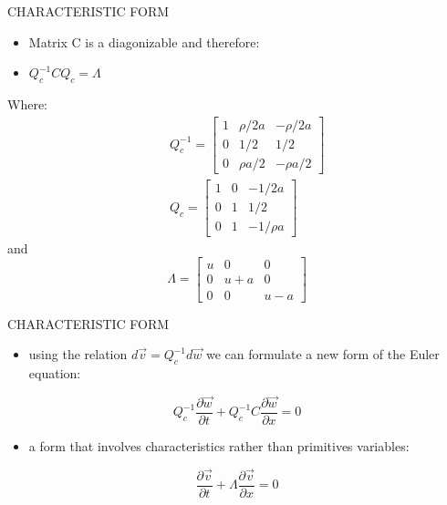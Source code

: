 \documentclass{beamer}
\begin{document}
\begin{frame}{CHARACTERISTIC FORM}
  \begin{itemize}
   \item Matrix C is a diagonizable and therefore:
   \item $Q_c^{-1}CQ_c=\Lambda$
  \end{itemize}
Where:
  \begin{eqnarray}
    &&Q_c^{-1}=\begin{bmatrix}
    1 & \rho/2a & -\rho/2a\\ 
    0 & 1/2 & 1/2\\ 
    0 & {\rho}a/2 & -{\rho}a/2
    \end{bmatrix} \\
    &&Q_c=\begin{bmatrix}
    1 & 0 & -1/2a\\ 
    0 & 1 & 1/2 \\ 
    0 & 1 & -1/{\rho}a
    \end{bmatrix}
  \end{eqnarray}
and
  \begin{equation}
    \Lambda=\begin{bmatrix}
    u & 0 & 0\\ 
    0 & u+a & 0\\ 
    0 & 0 & u-a
    \end{bmatrix}
  \end{equation}
\end{frame}

\begin{frame}{CHARACTERISTIC FORM}
  \begin{itemize}
   \item using the relation $d\vec{v}=Q_c^{-1}d\vec{w}$ we can formulate a new form of the Euler equation:
  \end{itemize}
  \begin{equation}
    Q_c^{-1}\frac{\partial\vec{w}}{\partial{t}}+Q_c^{-1}C\frac{\partial\vec{w}}{\partial{x}}=0
  \end{equation}
  \begin{itemize}
   \item a form that involves characteristics rather than primitives variables:
  \end{itemize}
  \begin{equation}
    \frac{\partial\vec{v}}{\partial{t}}+\Lambda\frac{\partial\vec{v}}{\partial{x}}=0
  \end{equation}
\end{frame}
\end{document}
